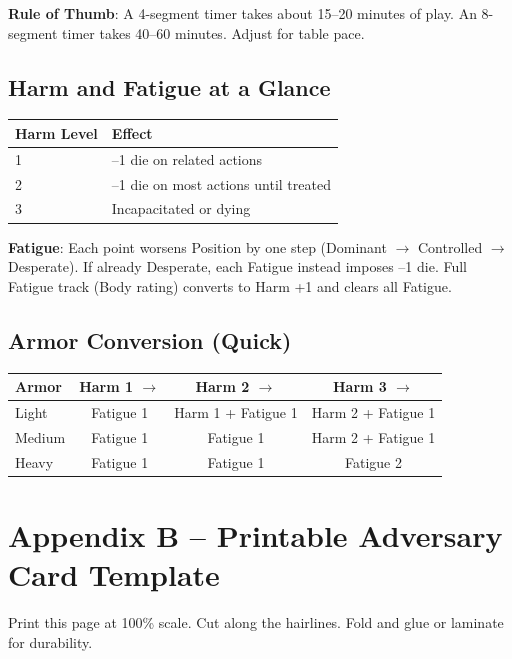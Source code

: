 \noindent\textbf{Rule of Thumb}: A 4-segment timer takes about 15--20 minutes of play. An 8-segment timer takes 40--60 minutes. Adjust for table pace.

\subsection*{Harm and Fatigue at a Glance}

\begin{tabular}{|l|l|}
\hline
\textbf{Harm Level} & \textbf{Effect} \\
\hline
1 & --1 die on related actions \\
2 & --1 die on most actions until treated \\
3 & Incapacitated or dying \\
\hline
\end{tabular}

\noindent\textbf{Fatigue}: Each point worsens Position by one step (Dominant $\rightarrow$ Controlled $\rightarrow$ Desperate). If already Desperate, each Fatigue instead imposes --1 die. Full Fatigue track (Body rating) converts to Harm +1 and clears all Fatigue.

\subsection*{Armor Conversion (Quick)}

\begin{tabular}{|l|c|c|c|}
\hline
\textbf{Armor} & \textbf{Harm 1 $\rightarrow$} & \textbf{Harm 2 $\rightarrow$} & \textbf{Harm 3 $\rightarrow$} \\
\hline
Light & Fatigue 1 & Harm 1 + Fatigue 1 & Harm 2 + Fatigue 1 \\
Medium & Fatigue 1 & Fatigue 1 & Harm 2 + Fatigue 1 \\
Heavy & Fatigue 1 & Fatigue 1 & Fatigue 2 \\
\hline
\end{tabular}


\section*{Appendix B -- Printable Adversary Card Template}

\noindent Print this page at 100\% scale. Cut along the hairlines. Fold and glue or laminate for durability.

